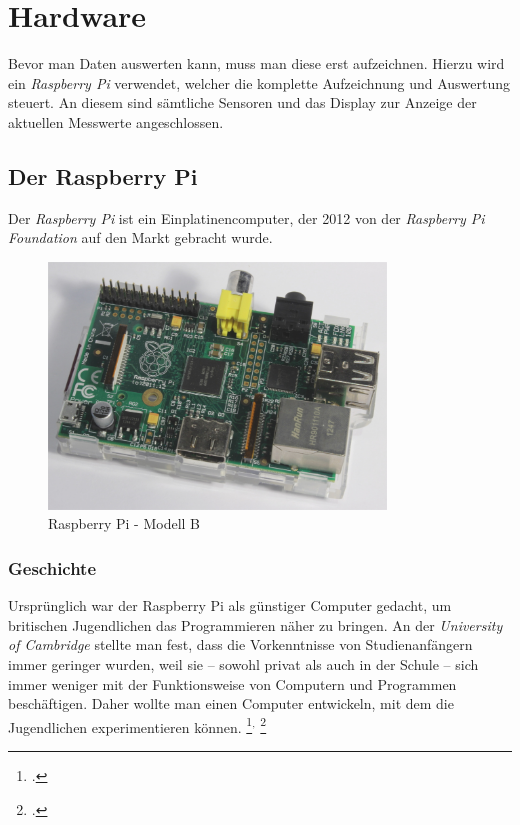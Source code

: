 \chapter{Hardware}
\label{cha:Hardware}

Bevor man Daten auswerten kann, muss man diese erst aufzeichnen. Hierzu wird ein \emph{Raspberry Pi} verwendet, welcher die komplette Aufzeichnung und Auswertung steuert. An diesem sind sämtliche Sensoren und das Display zur Anzeige der aktuellen Messwerte angeschlossen.

\section{Der Raspberry Pi}
\label{sec:Raspberry}
Der \emph{Raspberry Pi} ist ein \gls{Einplatinencomputer}, der 2012 von der \emph{Raspberry Pi Foundation} auf den Markt gebracht wurde.

\begin{figure}[h]
  \centering
     \includegraphics[width=0.8\textwidth]{figures/raspberry.jpg}
 \caption[Raspberry Pi - Modell B]{Raspberry Pi - Modell B}
  \label{fig:raspberry}
\end{figure}

\subsection{Geschichte}
\label{subsec:Geschichte}
Ursprünglich war der Raspberry Pi als günstiger Computer gedacht, um britischen Jugendlichen das Programmieren näher zu bringen. An der \emph{University of Cambridge} stellte man fest, dass die Vorkenntnisse von Studienanfängern immer geringer wurden, weil sie -- sowohl privat als auch in der Schule -- sich immer weniger mit der Funktionsweise von Computern und Programmen beschäftigen. Daher wollte man einen Computer entwickeln, mit dem die Jugendlichen experimentieren können.
\footcite{aboutraspberry}$^,$
\footcite[Geschichte]{wiki:raspberry}


